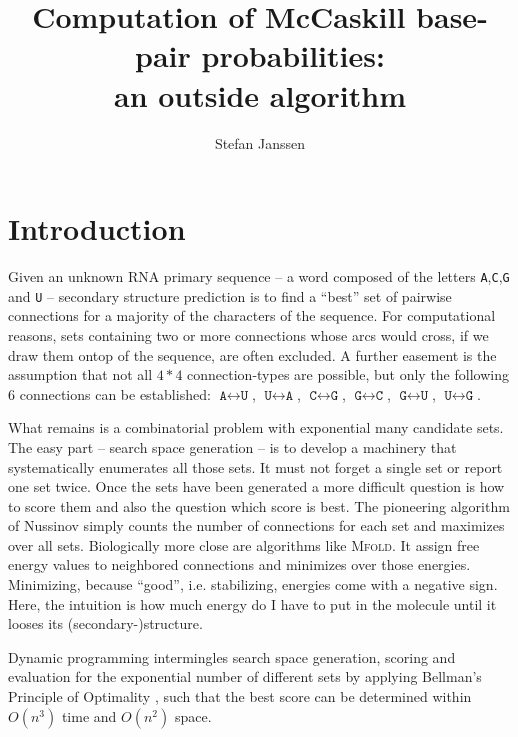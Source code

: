 \documentclass[paper=a4,fontsize=12pt]{scrartcl}
\title{Computation of McCaskill base-pair probabilities:\\ an outside algorithm}
\author{Stefan Janssen}
\newcommand{\progname}[1]{\mbox{\textsc{#1}}\xspace}
\def\mfold{\progname{Mfold}}
\begin{document}
\maketitle

\section{Introduction}
Given an unknown RNA primary sequence -- a word composed of the letters \texttt{A},\texttt{C},\texttt{G} and \texttt{U} -- secondary structure prediction is to find a ``best'' set of pairwise connections for a majority of the characters of the sequence. For computational reasons, sets containing two or more connections whose arcs would cross, if we draw them ontop of the sequence, are often excluded. A further easement is the assumption that not all $4*4$ connection-types are possible, but only the following $6$ connections can be established: $\texttt{A} \leftrightarrow \texttt{U}$, $\texttt{U} \leftrightarrow \texttt{A}$, $\texttt{C} \leftrightarrow \texttt{G}$, $\texttt{G} \leftrightarrow \texttt{C}$, $\texttt{G} \leftrightarrow \texttt{U}$, $\texttt{U} \leftrightarrow \texttt{G}$.

What remains is a combinatorial problem with exponential many candidate sets. The easy part -- search space generation -- is to develop a machinery that systematically enumerates all those sets. It must not forget a single set or report one set twice. Once the sets have been generated a more difficult question is how to score them and also the question which score is best. The pioneering algorithm of Nussinov \cite{NUS:PIE:GRI:KLE:1978} simply counts the number of connections for each set and maximizes over all sets. Biologically more close are algorithms like \mfold \cite{ZUK:STI:1981}. It assign free energy values to neighbored connections and minimizes over those energies. Minimizing, because ``good'', i.e. stabilizing, energies come with a negative sign. Here, the intuition is how much energy do I have to put in the molecule until it looses its (secondary-)structure.

Dynamic programming intermingles search space generation, scoring and evaluation for the exponential number of different sets by applying Bellman's Principle of Optimality \cite{BEL:1957}, such that the best score can be determined within $O(n^3)$ time and $O(n^2)$ space. %
\end{document}
